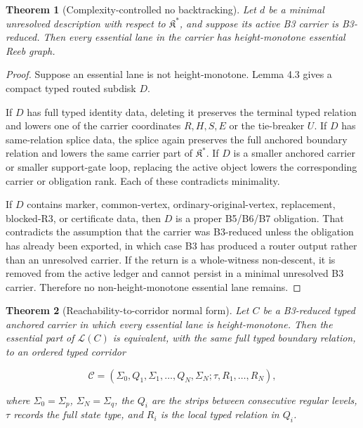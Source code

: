 \documentclass[11pt]{amsart}
\newtheorem{theorem}{Theorem}[section]
\theoremstyle{definition}
\begin{document}
\begin{theorem}[Complexity-controlled no backtracking]
Let \(d\) be a minimal unresolved description with respect to \(\mathfrak K^\ast\), and suppose its active B3 carrier is B3-reduced. Then every essential lane in the carrier has height-monotone essential Reeb graph.

\end{theorem}
\begin{proof}
Suppose an essential lane is not height-monotone. Lemma 4.3 gives a compact typed routed subdisk \(D\).

If \(D\) has full typed identity data, deleting it preserves the terminal typed relation and lowers one of the carrier coordinates \(R,H,S,E\) or the tie-breaker \(U\). If \(D\) has same-relation splice data, the splice again preserves the full anchored boundary relation and lowers the same carrier part of \(\mathfrak K^\ast\). If \(D\) is a smaller anchored carrier or smaller support-gate loop, replacing the active object lowers the corresponding carrier or obligation rank. Each of these contradicts minimality.

If \(D\) contains marker, common-vertex, ordinary-original-vertex, replacement, blocked-R3, or certificate data, then \(D\) is a proper B5/B6/B7 obligation. That contradicts the assumption that the carrier was B3-reduced unless the obligation has already been exported, in which case B3 has produced a router output rather than an unresolved carrier. If the return is a whole-witness non-descent, it is removed from the active ledger and cannot persist in a minimal unresolved B3 carrier. Therefore no non-height-monotone essential lane remains.

\end{proof}
\begin{theorem}[Reachability-to-corridor normal form]
Let \(C\) be a B3-reduced typed anchored carrier in which every essential lane is height-monotone. Then the essential part of \(\mathcal L(C)\) is equivalent, with the same full typed boundary relation, to an ordered typed corridor

\[
\mathcal C=(\Sigma_0,Q_1,\Sigma_1,\ldots,Q_N,\Sigma_N;\tau,R_1,\ldots,R_N),
\]

where \(\Sigma_0=\Sigma_p\), \(\Sigma_N=\Sigma_q\), the \(Q_i\) are the strips between consecutive regular levels, \(\tau\) records the full state type, and \(R_i\) is the local typed relation in \(Q_i\).

\end{theorem}
\end{document}

